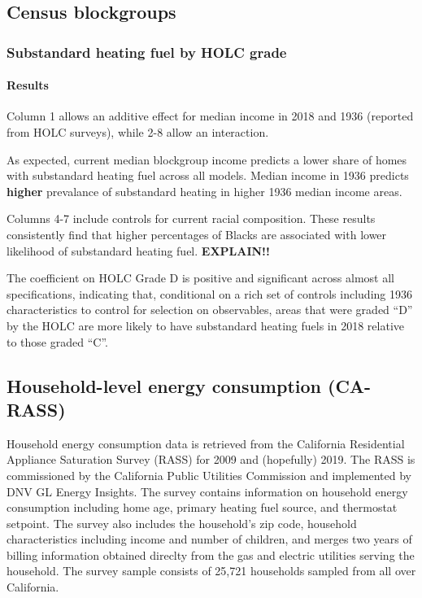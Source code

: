 \documentclass[
]{article}
\begin{document}
\hypertarget{census-blockgroups}{%
\subsection{Census blockgroups}\label{census-blockgroups}}

\hypertarget{substandard-heating-fuel-by-holc-grade}{%
\subsubsection{Substandard heating fuel by HOLC grade}\label{substandard-heating-fuel-by-holc-grade}}

\hypertarget{results}{%
\paragraph{Results}\label{results}}

Column 1 allows an additive effect for median income in 2018 and 1936 (reported from HOLC surveys), while 2-8 allow an interaction.

As expected, current median blockgroup income predicts a lower share of homes with substandard heating fuel across all models.
Median income in 1936 predicts \textbf{higher} prevalance of substandard heating in higher 1936 median income areas.

Columns 4-7 include controls for current racial composition.
These results consistently find that higher percentages of Blacks are associated with lower likelihood of substandard heating fuel. \textbf{EXPLAIN!!}

The coefficient on HOLC Grade D is positive and significant across almost all specifications, indicating that, conditional on a rich set of controls
including 1936 characteristics to control for selection on observables, areas that were graded ``D'' by the HOLC are more likely to have substandard
heating fuels in 2018 relative to those graded ``C''.

\hypertarget{household-level-energy-consumption-ca-rass}{%
\subsection{Household-level energy consumption (CA-RASS)}\label{household-level-energy-consumption-ca-rass}}

Household energy consumption data is retrieved from the California Residential Appliance Saturation Survey (RASS) for 2009 and (hopefully) 2019. The RASS
is commissioned by the California Public Utilities Commission and implemented by DNV GL Energy Insights. The survey contains information on household
energy consumption including home age, primary heating fuel source, and thermostat setpoint. The survey also includes the household's zip code,
household characteristics including income and number of children, and merges two years of billing information obtained direclty from the gas and electric
utilities serving the household. The survey sample consists of 25,721 households sampled from all over California.
\end{document}
